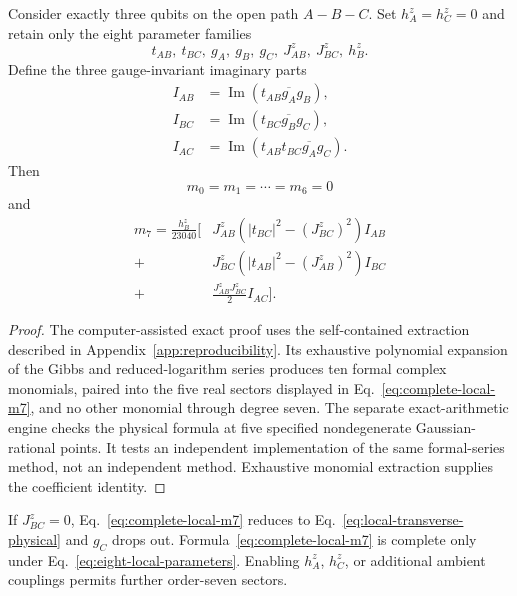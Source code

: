 \begin{proposition}
\label{prop:complete-local-m7}
Consider exactly three qubits on the open path $A\!-\!B\!-\!C$.  Set
$h_A^z=h_C^z=0$ and retain only the eight parameter families
\begin{equation}
 t_{AB},\ t_{BC},\ g_A,\ g_B,\ g_C,\
 J^z_{AB},\ J^z_{BC},\ h_B^z.
 \label{eq:eight-local-parameters}
\end{equation}
Define the three gauge-invariant imaginary parts
\begin{align}
 I_{AB}&=\operatorname{Im}
 \left(t_{AB}\overline{g_A}g_B\right),
 \nonumber\\
 I_{BC}&=\operatorname{Im}
 \left(t_{BC}\overline{g_B}g_C\right),
 \nonumber\\
 I_{AC}&=\operatorname{Im}
 \left(t_{AB}t_{BC}\overline{g_A}g_C\right).
 \label{eq:local-phase-invariants}
\end{align}
Then
\begin{equation}
 m_0=m_1=\cdots=m_6=0
 \label{eq:local-lower-orders}
\end{equation}
and
\begin{align}
 m_7=\frac{h_B^z}{23040}\Bigg[{}
 &J^z_{AB}\left(|t_{BC}|^2-(J^z_{BC})^2\right)I_{AB}
 \nonumber\\
 {}+{}&J^z_{BC}\left(|t_{AB}|^2-(J^z_{AB})^2\right)I_{BC}
 \nonumber\\
 {}+{}&\frac{J^z_{AB}J^z_{BC}}2 I_{AC}
 \Bigg].
 \label{eq:complete-local-m7}
\end{align}
\end{proposition}

\begin{proof}
The computer-assisted exact proof uses the self-contained extraction
described in Appendix~\ref{app:reproducibility}.  Its exhaustive polynomial
expansion of
the Gibbs and reduced-logarithm series produces ten formal complex
monomials, paired into the five real sectors displayed in
Eq.~\eqref{eq:complete-local-m7}, and no other monomial through degree seven.
The separate exact-arithmetic engine checks the physical formula at five
specified nondegenerate Gaussian-rational points.  It tests an independent
implementation of the same formal-series method, not an independent method.
Exhaustive monomial extraction supplies the coefficient identity.
\end{proof}

If $J^z_{BC}=0$, Eq.~\eqref{eq:complete-local-m7}
reduces to Eq.~\eqref{eq:local-transverse-physical} and $g_C$ drops out.
Formula~\eqref{eq:complete-local-m7} is complete only under
Eq.~\eqref{eq:eight-local-parameters}.  Enabling $h_A^z$, $h_C^z$, or
additional ambient couplings permits further order-seven sectors.

